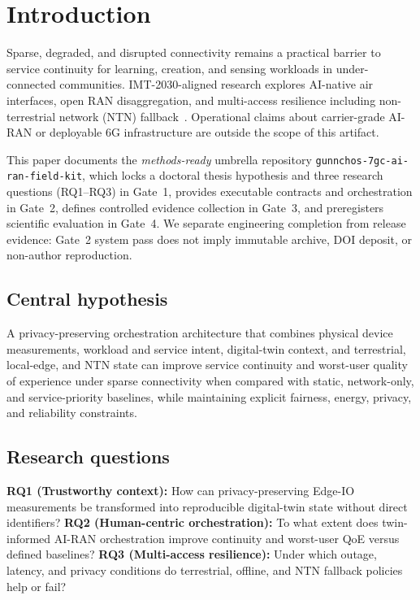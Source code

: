 \section{Introduction}
\label{sec:introduction}

Sparse, degraded, and disrupted connectivity remains a practical barrier to service continuity for learning, creation, and sensing workloads in under-connected communities.
IMT-2030-aligned research explores AI-native air interfaces, open RAN disaggregation, and multi-access resilience including non-terrestrial network (NTN) fallback~\cite{itu_m2160,saad2020vision,strinati20216g}.
Operational claims about carrier-grade AI-RAN or deployable 6G infrastructure are outside the scope of this artifact.

This paper documents the \emph{methods-ready} umbrella repository \texttt{gunnchos-7gc-ai-ran-field-kit}, which locks a doctoral thesis hypothesis and three research questions (RQ1--RQ3) in Gate~1, provides executable contracts and orchestration in Gate~2, defines controlled evidence collection in Gate~3, and preregisters scientific evaluation in Gate~4.
We separate engineering completion from release evidence: Gate~2 system pass does not imply immutable archive, DOI deposit, or non-author reproduction.

\subsection{Central hypothesis}
A privacy-preserving orchestration architecture that combines physical device measurements, workload and service intent, digital-twin context, and terrestrial, local-edge, and NTN state can improve service continuity and worst-user quality of experience under sparse connectivity when compared with static, network-only, and service-priority baselines, while maintaining explicit fairness, energy, privacy, and reliability constraints.

\subsection{Research questions}
\textbf{RQ1 (Trustworthy context):} How can privacy-preserving Edge-IO measurements be transformed into reproducible digital-twin state without direct identifiers?
\textbf{RQ2 (Human-centric orchestration):} To what extent does twin-informed AI-RAN orchestration improve continuity and worst-user QoE versus defined baselines?
\textbf{RQ3 (Multi-access resilience):} Under which outage, latency, and privacy conditions do terrestrial, offline, and NTN fallback policies help or fail?

